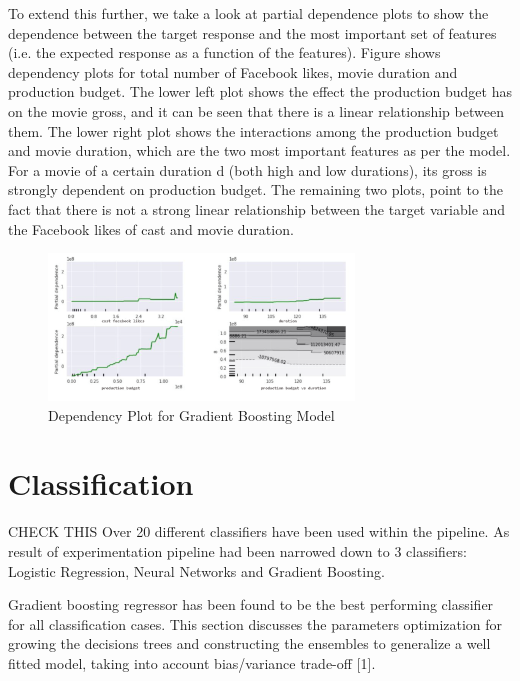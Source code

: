 To extend this further, we take a look at partial dependence plots to show the dependence between the target response and the most important set of features (i.e. the expected response as a function of the features). Figure shows dependency plots for total number of Facebook likes, movie duration and production budget. The lower left plot shows the effect the production budget has on the movie gross, and it can be seen that there is a linear relationship between them. The lower right plot shows the interactions among the production budget and movie duration, which are the two most important features as per the model. For a movie of a certain duration d (both high and low durations), its gross is strongly dependent on production budget.  The remaining two plots, point to the fact that there is not a strong linear relationship between the target variable and the Facebook likes of cast and movie duration.

\begin{figure}[h]
\centering
\includegraphics[width=3.2in]{figures/gradient_boost_dependency_}
\caption{Dependency Plot for Gradient Boosting Model} 
\label{fig:figgradientdep}
\end{figure}
\section{Classification}
CHECK THIS
Over 20 different classifiers have been used within the pipeline. As result of experimentation pipeline had been narrowed down to 3 classifiers: Logistic Regression, Neural Networks and Gradient Boosting.

Gradient boosting regressor has been found to be the best performing classifier for all classification cases. This section discusses the parameters optimization for growing the decisions trees and constructing the ensembles to generalize a well fitted model, taking into account bias/variance trade-off [1].

